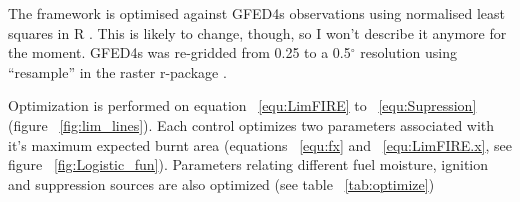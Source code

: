 \begin{shaded}
    The framework is optimised against GFED4s observations \citep{Giglio2013}  using normalised least squares in R \citep{rstats}.  This is likely to change, though, so I won't describe it anymore for the moment. GFED4s was re-gridded from 0.25 to a 0.5$^{\circ}$ resolution using ``resample'' in the raster r-package \citep{rraster}.
\end{shaded}

Optimization is performed on equation ~\ref{equ:LimFIRE} to ~\ref{equ:Supression} (figure ~\ref{fig:lim_lines}). Each control optimizes two parameters associated with it's maximum expected burnt area (equations ~\ref{equ:fx} and ~\ref{equ:LimFIRE.x}, see figure ~\ref{fig:Logistic_fun}).
Parameters relating different fuel moisture, ignition and suppression sources are also optimized (see table ~\ref{tab:optimize})

